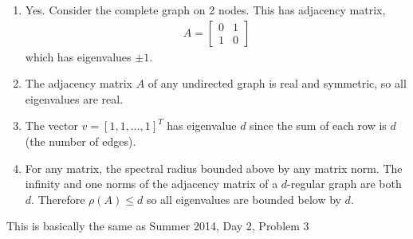 \documentclass[10pt]{article}
\begin{document}
\begin{solution}[Solution]
\begin{enumerate}[label=(\alph*)]
    \item Yes. Consider the complete graph on 2 nodes. This has adjacency matrix,
        \begin{align*}
            A = \left[\begin{array}{cc}0 & 1 \\ 1& 0\end{array}\right]
        \end{align*}
        which has eigenvalues \( \pm 1 \).
        
    \item The adjacency matrix \( A \) of any undirected graph is real and symmetric, so all eigenvalues are real. 
    \item The vector \( v=[1,1,\ldots, 1]^T \) has eigenvalue \( d \) since the sum of each row is \( d \) (the number of edges).
    \item For any matrix, the spectral radius bounded above by any matrix norm. The infinity and one norms of the adjacency matrix of a \( d \)-regular graph are both \( d \). Therefore \( \rho(A) \leq d \) so all eigenvalues are bounded below by \( d \). 
\end{enumerate}
    
\end{solution}



\begin{problem}
This is basically the same as Summer 2014, Day 2, Problem 3
\end{problem}

\begin{solution}[Solution]
    
\end{solution}
\end{document}
